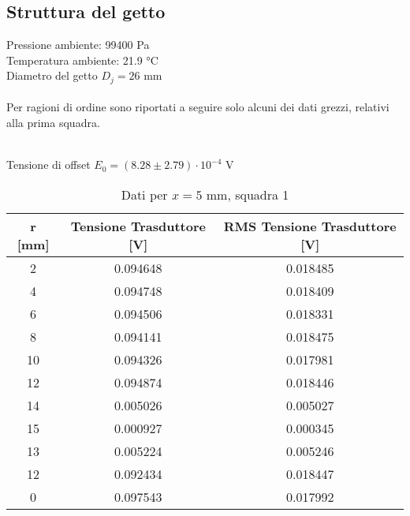 \newpage

\subsection{Struttura del getto}\label{a3}
Pressione ambiente: 99400 Pa\\
Temperatura ambiente: 21.9 °C\\
Diametro del getto $D_j=26$ mm\\\\
Per ragioni di ordine sono riportati a seguire solo alcuni dei dati grezzi, relativi alla prima squadra.

\noindent \\Tensione di offset $E_0 = (8.28\pm2.79)\cdot10^{-4}$ V

\begin{table}[h]
\centering
\begin{tabular}{|c|c|c|}
\hline
r {[}mm{]} & Tensione Trasduttore {[}V{]} & RMS Tensione Trasduttore {[}V{]} \\ \hline
2          & 0.094648                     & 0.018485                         \\ \hline
4          & 0.094748                     & 0.018409                         \\ \hline
6          & 0.094506                     & 0.018331                         \\ \hline
8          & 0.094141                     & 0.018475                         \\ \hline
10         & 0.094326                     & 0.017981                         \\ \hline
12         & 0.094874                     & 0.018446                         \\ \hline
14         & 0.005026                     & 0.005027                         \\ \hline
15         & 0.000927                     & 0.000345                         \\ \hline
13         & 0.005224                     & 0.005246                         \\ \hline
12         & 0.092434                     & 0.018447                         \\ \hline
0          & 0.097543                     & 0.017992                         \\ \hline
\end{tabular}
\caption{Dati per $x=5$ mm, squadra 1}
\end{table}

